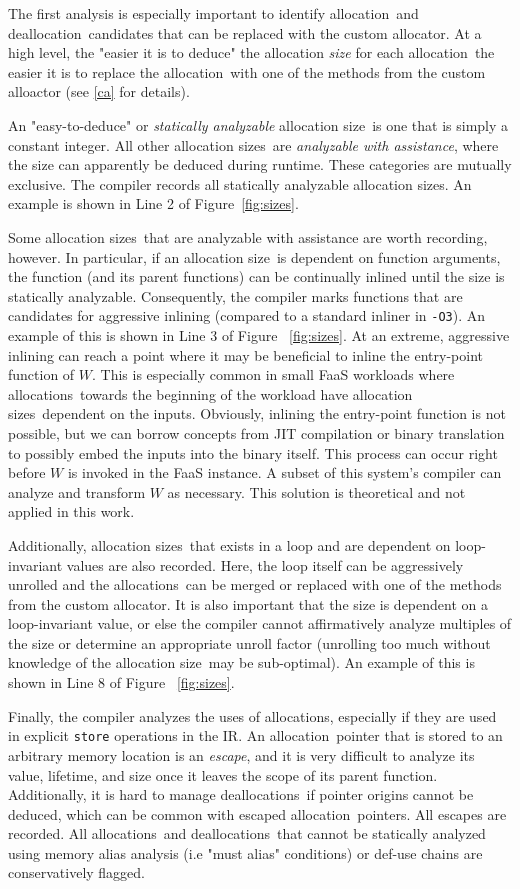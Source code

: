 \documentclass{article}
\def\ALL{allocation}
\def\DALL{deallocation}
\def\ALLS{allocations}
\def\DALLS{deallocations}
\def\SIZE{allocation size}
\def\SIZES{allocation sizes}
\begin{document}
The first analysis is especially important to identify \ALL\ and \DALL\ candidates that
can be replaced with the custom allocator. At a high level, the "easier it is to deduce"
the allocation \textit{size} for each \ALL\, the easier it is to replace the \ALL\ with one
of the methods from the custom alloactor (see \ref{ca} for details).

An "easy-to-deduce" or \textit{statically analyzable} \SIZE\ is one that is 
simply a constant integer. All other \SIZES\ are \textit{analyzable with
assistance}, where the size can apparently be deduced during runtime. These 
categories are mutually exclusive. The compiler records all statically analyzable 
\SIZES . An example is shown in Line 2 of Figure~\ref{fig:sizes}.

Some \SIZES\ that are analyzable with assistance are worth recording, however. In
particular, if an \SIZE\ is dependent on function arguments, the function (and
its parent functions) can be continually inlined until the size is statically
analyzable. Consequently, the compiler marks functions that are candidates for
aggressive inlining (compared to a standard inliner in \texttt{-O3}). An example of
this is shown in Line 3 of Figure ~\ref{fig:sizes}. At an
extreme, aggressive inlining can reach a point where it may be beneficial to
inline the entry-point function of $W$. This is especially common in small 
FaaS workloads where \ALLS\ towards the beginning of the workload have \SIZES\
dependent on the inputs. Obviously, inlining the entry-point function is not 
possible, but we can borrow concepts from JIT compilation or binary translation
to possibly embed the inputs into the binary itself. This process can occur
right before $W$ is invoked in the FaaS instance. A subset of this system's compiler
can analyze and transform $W$ as necessary. This solution is theoretical and 
not applied in this work.

Additionally, \SIZES\ that exists in a loop and are dependent on loop-invariant
values are also recorded. Here, the loop itself can be aggressively unrolled and
the \ALLS\ can be merged or replaced with one of the methods from the custom 
allocator. It is also important that the size is dependent on a loop-invariant 
value, or else the compiler cannot affirmatively analyze multiples of the size or
determine an appropriate unroll factor (unrolling too much without knowledge of
the \SIZE\ may be sub-optimal). An example of this is shown in Line 8 of Figure ~\ref{fig:sizes}.

Finally, the compiler analyzes the uses of \ALLS , especially if they are used
in explicit \texttt{store} operations in the IR. An \ALL\ pointer that is stored
to an arbitrary memory location is an \textit{escape}, and it is very difficult
to analyze its value, lifetime, and size once it leaves the scope of its parent
function. Additionally, it is hard to manage \DALLS\ if pointer origins
cannot be deduced, which can be common with escaped \ALL\ pointers. All escapes
are recorded. All \ALLS\ and \DALLS\ that cannot be statically analyzed using
memory alias analysis (i.e "must alias" conditions) or def-use chains are conservatively flagged.
\end{document}
